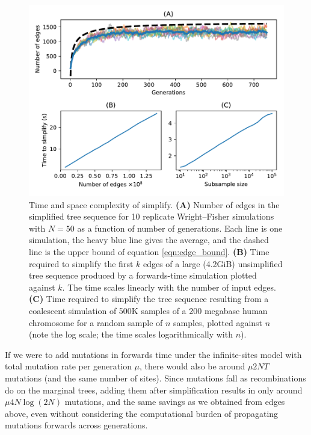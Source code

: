 \documentclass{article}
\begin{document}
\begin{figure}
    \begin{center}
        \includegraphics{sims/simplify-results}
    \end{center}
    \caption{
        Time and space complexity of simplify.
        \textbf{(A)}
        Number of edges in the simplified tree sequence
        for 10 replicate Wright--Fisher simulations with $N=50$ as a function
        of number of generations.
        Each line is one simulation, the heavy blue line gives the average,
        and the dashed line is the upper bound of equation \eqref{eqn:edge_bound}.
        \textbf{(B)}
        Time required to simplify the first $k$ edges of a large (4.2GiB)
        unsimplified tree sequence produced by a forwards-time simulation plotted
        against $k$. The time scales linearly with the number of input edges.
        \textbf{(C)}
        Time required to simplify the tree sequence resulting from a coalescent
        simulation of 500K samples of a 200 megabase human chromosome
        for a random sample of $n$ samples, plotted against $n$
        (note the log scale; the time scales logarithmically with $n$).
        \label{fig:simplify_complexity}
    }
\end{figure}

If we were to add mutations in forwards time
under the infinite-sites model with total mutation rate per generation $\mu$,
there would also be around $\mu 2NT$ mutations (and the same number of sites).
Since mutations fall as recombinations do on the marginal trees,
adding them after simplification results in only around $\mu 4 N \log(2N)$ mutations,
and the same savings as we obtained from edges above,
even without considering the
computational burden of propagating mutations forwards across generations.
\end{document}
